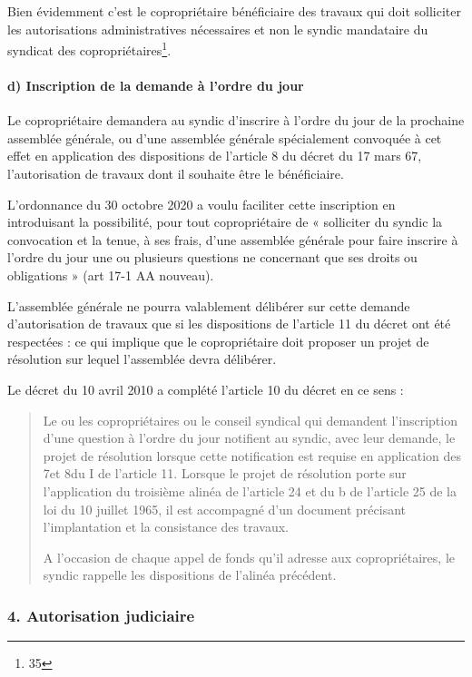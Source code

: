 				Bien évidemment c’est le copropriétaire bénéficiaire des travaux qui doit solliciter les autorisations administratives nécessaires et non le syndic mandataire du syndicat des copropriétaires\footnote{35}.
			
			\paragraph{d) Inscription de la demande à l’ordre du jour}
				
				Le copropriétaire demandera au syndic d'inscrire à l'ordre du jour de la prochaine assemblée générale, ou d'une assemblée générale spécialement convoquée à cet effet en application des dispositions de l'article 8 du décret du 17 mars 67, l'autorisation de travaux dont il souhaite être le bénéficiaire.
				
				L’ordonnance du 30 octobre 2020 a voulu faciliter cette inscription en introduisant la possibilité, pour tout copropriétaire de « solliciter du syndic la convocation et la tenue, à ses frais, d'une assemblée générale pour faire inscrire à l'ordre du jour une ou plusieurs questions ne concernant que ses droits ou obligations » (art 17-1 AA nouveau).
				
				L'assemblée générale ne pourra valablement délibérer sur cette demande d'autorisation de travaux que si les dispositions de l'article 11 du décret ont été respectées : ce qui implique que le copropriétaire doit proposer un projet de résolution sur lequel l'assemblée devra délibérer.
				
				Le décret du 10 avril 2010 a complété l’article 10 du décret en ce sens :
				\begin{quote}
					Le ou les copropriétaires ou le conseil syndical qui demandent l’inscription d’une question à l’ordre du jour notifient au syndic, avec leur demande, le projet de résolution lorsque cette notification est requise en application des 7\degres et 8\degres du I de l’article 11. Lorsque le projet de résolution porte sur l’application du troisième alinéa de l’article 24 et du b de l’article 25 de la loi du 10 juillet 1965, il est accompagné d’un document précisant l’implantation et la consistance des travaux.
					
					A l’occasion de chaque appel de fonds qu’il adresse aux copropriétaires, le syndic rappelle les dispositions de l’alinéa précédent.
				\end{quote}
		
		\subsubsection{4. Autorisation judiciaire}
		
